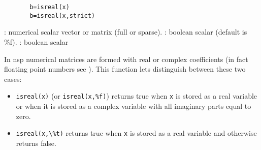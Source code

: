 


\begin{mandesc}
\end{mandesc}


\begin{calling_sequence}
    \begin{verbatim}
       b=isreal(x)  
       b=isreal(x,strict)  
    \end{verbatim}
\end{calling_sequence}

\begin{parameters}
  \begin{varlist}
    : numerical scalar vector or matrix (full or sparse).
    : boolean scalar (default is \%f).
    : boolean scalar
  \end{varlist}
\end{parameters}

\begin{mandescription}
In nsp numerical matrices are formed with real or complex coefficients
(in fact floating point numbers see
). This function
lets distinguish between these two cases:
\begin{itemize}
\item \verb!isreal(x)! (or \verb!isreal(x,%f)!) returns true when 
\verb!x! is stored as a real variable or when it is stored 
as a complex variable with all imaginary parts equal
to zero. 
\item \verb!isreal(x,\%t)! returns true when \verb!x! is stored as a real
variable and otherwise returns false.
\end{itemize}

\end{mandescription}

\begin{examples}

\begin{program}
\end{program}

\end{examples}

